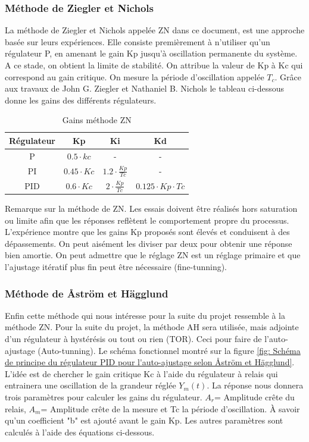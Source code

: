 \subsubsection{Méthode de Ziegler et Nichols}
La méthode de Ziegler et Nichols appelée ZN dans ce document, est une approche basée sur leurs expériences. Elle consiste premièrement à n'utiliser qu'un régulateur P, en amenant le gain Kp jusqu'à oscillation permanente du système. A ce stade, on obtient la limite de stabilité. On attribue la valeur de Kp à Kc qui correspond au gain critique. On mesure la période d'oscillation appelée $T_c$. Grâce aux travaux de John G. Ziegler et Nathaniel B. Nichols le tableau ci-dessous donne les gains des différents régulateurs.\cite{ZN} \\ 
\begin{table}[h]
	\begin{center}
		\begin{tabular}{|c|c|c|c|}
			\hline
			Régulateur & Kp  & Ki  & Kd \\
			\hline
			P& $0.5 \cdot kc$ & -  &  - \\
			\hline
			PI& $0.45 \cdot Kc$ & $1.2 \cdot \frac{Kp}{Tc}$ &  - \\
			\hline
			PID& $0.6 \cdot Kc$ & $2 \cdot \frac{Kp}{Tc}$ & $0.125\cdot Kp\cdot Tc $ \\
			\hline
		\end{tabular}
	\end{center}
\caption{Gains méthode ZN }
\label{tab: gain ZN}

\end{table}
Remarque sur la méthode de ZN. Les essais doivent être réalisés hors saturation ou limite afin que les réponses reflètent le comportement propre du processus. L'expérience montre que les gains Kp proposés sont élevés et conduisent à des dépassements. On peut aisément les diviser par deux pour obtenir une réponse bien amortie. On peut admettre que le réglage ZN est un réglage primaire et que l'ajustage itératif plus fin peut être nécessaire (fine-tunning).
\subsubsection{Méthode de Åström et Hägglund}
Enfin cette méthode qui nous intéresse pour la suite du projet ressemble à la méthode ZN. Pour la suite du projet, la méthode AH sera utilisée, mais adjointe d'un régulateur à hystérésis ou tout ou rien (TOR). Ceci pour faire de l'auto-ajustage (Auto-tunning). Le schéma fonctionnel montré sur la figure \ref{fig: Schéma de principe du régulateur PID pour l'auto-ajustage selon Åström et Hägglund}. L'idée est de chercher le gain critique Kc à l'aide du régulateur à relais qui entrainera une oscillation de la grandeur réglée $Y_m(t)$. La réponse nous donnera trois paramètres pour calculer les gains du régulateur. $A_r$= Amplitude crête du relais, $A_m$= Amplitude crête de la mesure et Tc la période d'oscillation. \`{A} savoir qu'un coefficient "b" est ajouté avant le gain Kp. Les autres paramètres sont calculés à l'aide des équations ci-dessous. \cite{AH}

